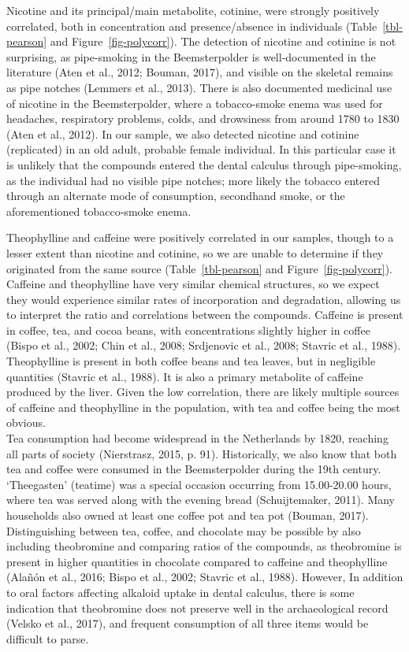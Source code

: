 \documentclass[
]{article}
\begin{document}
Nicotine and its principal/main metabolite, cotinine, were strongly
positively correlated, both in concentration and presence/absence in
individuals (Table~\ref{tbl-pearson} and Figure~\ref{fig-polycorr}). The
detection of nicotine and cotinine is not surprising, as pipe-smoking in
the Beemsterpolder is well-documented in the literature (Aten et al.,
2012; Bouman, 2017), and visible on the skeletal remains as pipe notches
(Lemmers et al., 2013). There is also documented medicinal use of
nicotine in the Beemsterpolder, where a tobacco-smoke enema was used for
headaches, respiratory problems, colds, and drowsiness from around 1780
to 1830 (Aten et al., 2012). In our sample, we also detected nicotine
and cotinine (replicated) in an old adult, probable female individual.
In this particular case it is unlikely that the compounds entered the
dental calculus through pipe-smoking, as the individual had no visible
pipe notches; more likely the tobacco entered through an alternate mode
of consumption, secondhand smoke, or the aforementioned tobacco-smoke
enema.

Theophylline and caffeine were positively correlated in our samples,
though to a lesser extent than nicotine and cotinine, so we are unable
to determine if they originated from the same source
(Table~\ref{tbl-pearson} and Figure~\ref{fig-polycorr}). Caffeine and
theophylline have very similar chemical structures, so we expect they
would experience similar rates of incorporation and degradation,
allowing us to interpret the ratio and correlations between the
compounds. Caffeine is present in coffee, tea, and cocoa beans, with
concentrations slightly higher in coffee (Bispo et al., 2002; Chin et
al., 2008; Srdjenovic et al., 2008; Stavric et al., 1988). Theophylline
is present in both coffee beans and tea leaves, but in negligible
quantities (Stavric et al., 1988). It is also a primary metabolite of
caffeine produced by the liver. Given the low correlation, there are
likely multiple sources of caffeine and theophylline in the population,
with tea and coffee being the most obvious.\\
Tea consumption had become widespread in the Netherlands by 1820,
reaching all parts of society (Nierstrasz, 2015, p. 91). Historically,
we also know that both tea and coffee were consumed in the
Beemsterpolder during the 19th century. `Theegasten' (teatime) was a
special occasion occurring from 15.00-20.00 hours, where tea was served
along with the evening bread (Schuijtemaker, 2011). Many households also
owned at least one coffee pot and tea pot (Bouman, 2017). Distinguishing
between tea, coffee, and chocolate may be possible by also including
theobromine and comparing ratios of the compounds, as theobromine is
present in higher quantities in chocolate compared to caffeine and
theophylline (Alañón et al., 2016; Bispo et al., 2002; Stavric et al.,
1988). However, In addition to oral factors affecting alkaloid uptake in
dental calculus, there is some indication that theobromine does not
preserve well in the archaeological record (Velsko et al., 2017), and
frequent consumption of all three items would be difficult to parse.
\end{document}
